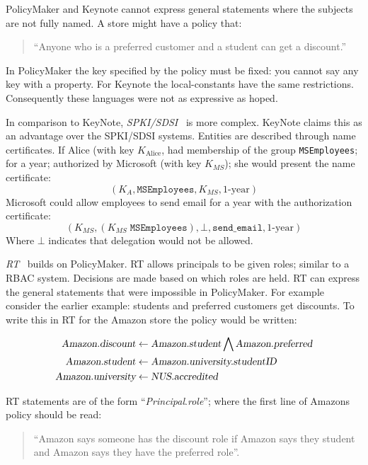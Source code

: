 \documentclass[a4paper,sfsidenotes]{%
  scrartcl%
}
\begin{document}
PolicyMaker and Keynote cannot express
general statements where the subjects are not fully named.  A store
might have a policy that:
\begin{quote} ``Anyone who is a
  preferred customer and a student can get a discount.'' 
\end{quote}  
In PolicyMaker the key specified by the policy must be fixed: you cannot say any
key with a property.  For Keynote the local-constants have the same
restrictions.  Consequently these languages were not as expressive as hoped.


In comparison to KeyNote, \emph{SPKI/SDSI}~\cite{Ellison:1999ui} is more
complex.  KeyNote claims this as an advantage over the SPKI/SDSI systems.
Entities are described through name certificates.  If Alice (with key
$K_\text{Alice}$, had membership of the group \texttt{MSEmployees}; for a year;
authorized by Microsoft (with key $K_{MS}$); she would present the name
certificate: \[\left(K_A,\texttt{MSEmployees},K_{MS},\text{1-year}\right)\]
Microsoft could allow employees to send email for
a year with the authorization certificate:
\[\left(K_{MS},\left(K_{MS}\;\texttt{MSEmployees}\right),\bot,\texttt{send\_email},\text{1-year}\right)\]
Where $\bot$ indicates that delegation would not be allowed.  

\emph{RT}~\cite{Li:2002if} builds on PolicyMaker. RT allows principals to be
given roles; similar to a \ac{RBAC} system. Decisions are made based on which
roles are held.
RT can express the general statements that were impossible in PolicyMaker.
For example consider the earlier example: students and preferred customers get
discounts. To write this in RT for the Amazon store the policy would be written:

\begin{align*}
  \textsl{Amazon.discount}   & \gets  \textsl{Amazon.student} \bigwedge \textsl{Amazon.preferred} \\
  \textsl{Amazon.student}    & \gets  \textsl{Amazon.university.studentID}                        \\
  \textsl{Amazon.university} & \gets  \textsl{NUS.accredited}                                     \\
\end{align*}

RT statements are of the form ``\textsl{Principal}.\textsl{role}''; where the
first line of Amazons policy should be read: 
\begin{quote}
  ``Amazon says someone has the discount role if Amazon says they student and
  Amazon says  they have the preferred role''.
\end{quote}
\end{document}
